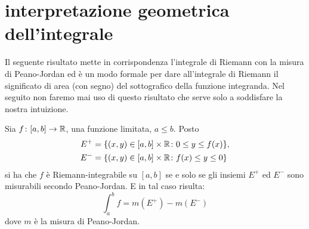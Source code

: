 \section{interpretazione geometrica dell'integrale}
%
%

Il seguente risultato mette in corrispondenza l'integrale di Riemann 
con la misura di Peano-Jordan ed è un modo formale per dare all'integrale 
di Riemann il significato di area (con segno) del sottografico della 
funzione integranda. 
Nel seguito non faremo mai uso di questo risultato che serve solo 
a soddisfare la nostra intuizione.

\begin{theorem}
Sia $f\colon[a,b]\to {\mathbb R}$, una funzione limitata, $a\leq b$. Posto 
\begin{align*}
  E^+ &= {\left\{ (x,y)\in [a,b]\times{\mathbb R}\colon 0\le y \le f(x) \right\}}, \\
  E^- &= {\left\{ (x,y)\in [a,b]\times{\mathbb R}\colon f(x)\le y \le 0 \right\}}   
\end{align*}
si ha che $f$ è Riemann-integrabile su $[a,b]$ se e solo se 
gli insiemi $E^+$ ed $E^-$ sono misurabili secondo Peano-Jordan.
E in tal caso risulta:
\[
   \int_a^b f = m(E^+) - m(E^-)  
\]
dove $m$ è la misura di Peano-Jordan.
\end{theorem}
%
